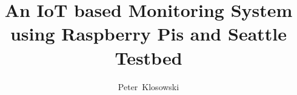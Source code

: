 
\title{An IoT based Monitoring System using Raspberry Pis and Seattle Testbed}
\newcommand{\name}{Peter~Klosowski}
\author{\name}
\newcommand{\betreuer}{Univ.-Prof.~Dipl.-Math.~Peter~Reichl,~M.A.~St.}
\newcommand{\gutachterA}{Dr.~Bakk.~(FH)~Albert~Rafetseder,~BSc~MSc}

\newcommand{\dissertationsgebiet}{Computer Science}
\newcommand{\studienkennzahl}{A 033 521}
\newcommand{\akademischergrad}{Bachelor of Science}
